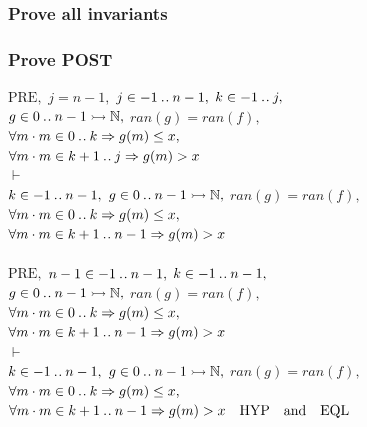 \documentclass[11pt,a4paper,fleqn]{article}
\begin{document}
\subsubsection{Prove all invariants}

\subsubsection{Prove POST}
\noindent
$ \text{PRE},$
$j=n-1,$
$j\in -1\mathbin{.\mkern1mu.} n-1,$
$k\in -1\mathbin{.\mkern1mu.} j,$\\
$g\in 0\mathbin{.\mkern1mu.} n-1\rightarrowtail\mathbb{N},$
$ran(g)=ran(f),$\\
$ \forall m \cdot m \in 0 \mathbin{.\mkern1mu.} k \Rightarrow g(m) \leq x ,$\\
$ \forall m \cdot m \in k+1 \mathbin{.\mkern1mu.} j \Rightarrow g(m)>x$\\
$\vdash$\\
$k\in -1\mathbin{.\mkern1mu.} n-1,$
$g\in 0\mathbin{.\mkern1mu.} n-1\rightarrowtail\mathbb{N},$
$ran(g)=ran(f),$\\
$ \forall m \cdot m \in 0 \mathbin{.\mkern1mu.} k \Rightarrow g(m) \leq x ,$\\
$ \forall m \cdot m \in k+1 \mathbin{.\mkern1mu.} n-1 \Rightarrow g(m)>x$\\
\\
$\text{PRE},$
$n-1\in -1\mathbin{.\mkern1mu.} n-1,$
$k\in -1\mathbin{.\mkern1mu.} n-1,$\\
$g\in 0\mathbin{.\mkern1mu.} n-1\rightarrowtail\mathbb{N},$
$ran(g)=ran(f),$\\
$ \forall m \cdot m \in 0 \mathbin{.\mkern1mu.} k \Rightarrow g(m) \leq x ,$\\
$ \forall m \cdot m \in k+1 \mathbin{.\mkern1mu.} n-1 \Rightarrow g(m)>x$\\
$\vdash$\\
$k\in -1\mathbin{.\mkern1mu.} n-1,$
$g\in 0\mathbin{.\mkern1mu.} n-1\rightarrowtail\mathbb{N},$
$ran(g)=ran(f),$\\
$ \forall m \cdot m \in 0 \mathbin{.\mkern1mu.} k \Rightarrow g(m) \leq x ,$\\
$ \forall m \cdot m \in k+1 \mathbin{.\mkern1mu.} n-1 \Rightarrow g(m)>x\quad \text{HYP\quad and\quad EQL}$\\
\end{document}
